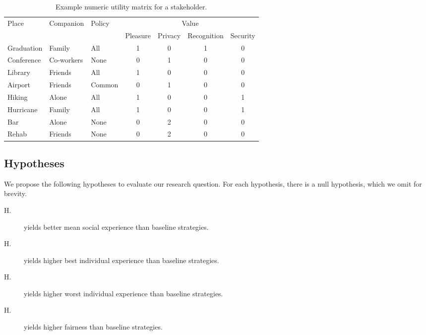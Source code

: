 \begin{table}[!htb]
\centering
\caption[Example numeric utility matrix for a stakeholder]{Example numeric utility matrix for a stakeholder.}
\label{tab:utlitymatrix}
\begin{tabular}{lllcccc}
\toprule
\multirow{2}{*}{Place} & \multirow{2}{*}{Companion} & \multirow{2}{*}{Policy} & \multicolumn{4}{c}{Value}\\
\cmidrule{4-7}
& & & Pleasure & Privacy & Recognition & Security\\
\midrule
\rowcolor{lightgray!50!}
Graduation & Family & All &1&0&1&0 \\ 
Conference & Co-workers & None &0&1&0&0 \\
\rowcolor{lightgray!50!}
Library & Friends & All &1&0&0&0 \\
Airport & Friends & Common &0&1&0&0 \\
\rowcolor{lightgray!50!}
Hiking & Alone & All &1&0&0&1 \\
Hurricane & Family & All &1&0&0&1 \\
\rowcolor{lightgray!50!}
Bar & Alone & None &0&2&0&0 \\
Rehab & Friends & None &0&2&0&0\\
\bottomrule
\end{tabular}
\end{table}

\subsection{Hypotheses}

We propose the following hypotheses to evaluate our research question. For each hypothesis, there is a null hypothesis, which we omit for brevity. 

\begin{description}
\item[H.] \frameworkAinur yields better mean social experience than baseline strategies. 
\item[H.] \frameworkAinur yields higher best individual experience than baseline strategies. 
\item[H.] \frameworkAinur yields higher worst individual experience than baseline strategies. 
\item[H.] \frameworkAinur yields higher fairness than baseline strategies. 
\end{description}


